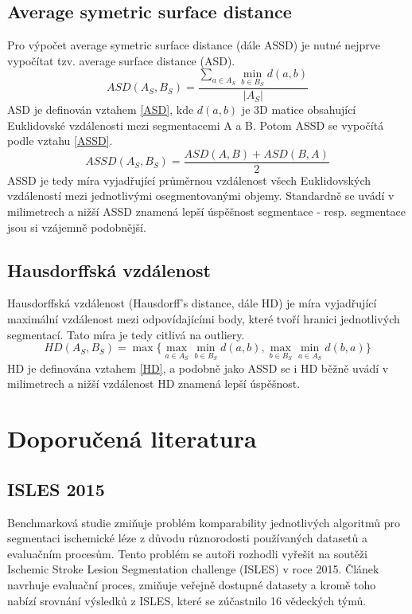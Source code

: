 \documentclass[11pt]{article}
\begin{document}
\subsection{Average symetric surface distance}
Pro výpočet average symetric surface distance (dále ASSD) je nutné nejprve vypočítat tzv. average surface distance (ASD).
\begin{equation}
	\label{ASD}
	ASD(A_S, B_S) = \frac{\sum_{a \in A_S} \min_{b \in B_S} d(a,b)}{|A_S|}
\end{equation}
ASD je definován vztahem \ref{ASD}, kde $d(a,b)$ je 3D matice obsahující Euklidovské vzdálenosti mezi segmentacemi A a B. Potom ASSD se vypočítá podle vztahu \ref{ASSD}.
\begin{equation}
	\label{ASSD}
	ASSD(A_S, B_S) = \frac{ASD(A, B) + ASD(B, A)}{2}
\end{equation}
ASSD je tedy míra vyjadřující průměrnou vzdálenost všech Euklidovských vzdáleností mezi jednotlivými osegmentovanými objemy. Standardně se uvádí v milimetrech a nižší ASSD znamená lepší úspěšnost segmentace - resp. segmentace jsou si vzájemně podobnější.

\subsection{Hausdorffská vzdálenost}
Hausdorffská vzdálenost (Hausdorff's distance, dále HD) je míra vyjadřující maximální vzdálenost mezi odpovídajícími body, které tvoří hranici jednotlivých segmentací. Tato míra je tedy citlivá na \alert{outliery}.
\begin{equation}
	\label{HD}
	HD(A_S, B_S) = \max \{\max_{a \in A_S}\min_{b \in B_S} d(a,b), \max_{b \in B_S}\min_{a \in A_S} d(b,a)\}
\end{equation}
HD je definována vztahem \ref{HD}, a podobně jako ASSD se i HD běžně uvádí v milimetrech a nižší vzdálenost HD znamená lepší úspěšnost.

\section{Doporučená literatura}
\subsection{ISLES 2015}
Benchmarková studie \cite{Maier2016} zmiňuje problém komparability jednotlivých algoritmů pro segmentaci ischemické léze z důvodu různorodosti používaných datasetů a evaluačním procesům. Tento problém se autoři rozhodli vyřešit na soutěži Ischemic Stroke Lesion Segmentation challenge (ISLES) v roce 2015. Článek navrhuje evaluační proces, zmiňuje veřejně dostupné datasety a kromě toho nabízí srovnání výsledků z ISLES, které se zúčastnilo 16 vědeckých týmů.
\end{document}
